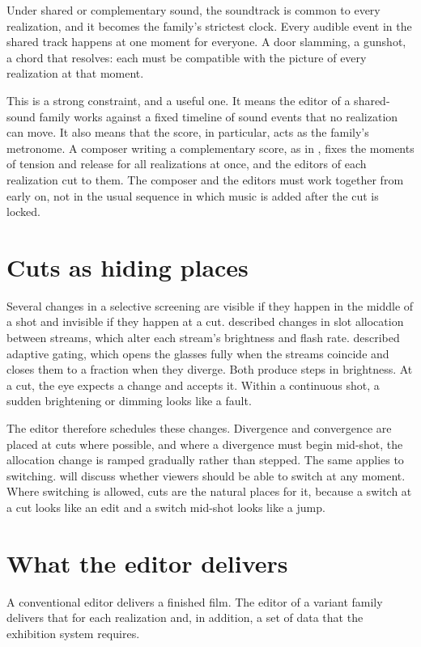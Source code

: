 Under shared or complementary sound, the soundtrack is common to every realization, and it becomes the family's strictest clock. Every audible event in the shared track happens at one moment for everyone. A door slamming, a gunshot, a chord that resolves: each must be compatible with the picture of every realization at that moment.

This is a strong constraint, and a useful one. It means the editor of a shared-sound family works against a fixed timeline of sound events that no realization can move. It also means that the score, in particular, acts as the family's metronome. A composer writing a complementary score, as in , fixes the moments of tension and release for all realizations at once, and the editors of each realization cut to them. The composer and the editors must work together from early on, not in the usual sequence in which music is added after the cut is locked.

\section{Cuts as hiding places}

Several changes in a selective screening are visible if they happen in the middle of a shot and invisible if they happen at a cut.  described changes in slot allocation between streams, which alter each stream's brightness and flash rate.  described adaptive gating, which opens the glasses fully when the streams coincide and closes them to a fraction when they diverge. Both produce steps in brightness. At a cut, the eye expects a change and accepts it. Within a continuous shot, a sudden brightening or dimming looks like a fault.

The editor therefore schedules these changes. Divergence and convergence are placed at cuts where possible, and where a divergence must begin mid-shot, the allocation change is ramped gradually rather than stepped. The same applies to switching.  will discuss whether viewers should be able to switch at any moment. Where switching is allowed, cuts are the natural places for it, because a switch at a cut looks like an edit and a switch mid-shot looks like a jump.

\section{What the editor delivers}

A conventional editor delivers a finished film. The editor of a variant family delivers that for each realization and, in addition, a set of data that the exhibition system requires.

